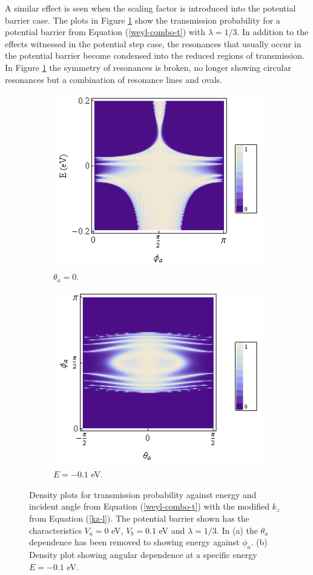 		A similar effect is seen when the scaling factor is introduced into the potential barrier case. The plots in Figure \ref{barrier-l3} show the transmission probability for a potential barrier from Equation (\ref{weyl-combo-t}) with $\lambda=1/3$. In addition to the effects witnessed in the potential step case, the resonances that usually occur in the potential barrier become condensed into the reduced regions of transmission. In Figure \ref{barrier-l3} the symmetry of resonances is broken, no longer showing circular resonances but a combination of resonance lines and ovals.
		\begin{figure}[h]
			\begin{subfigure}[h]{0.5\textwidth}
				\centerline{\includegraphics[scale=0.55]{images/barrier-l3}}
				\caption{$\theta_{a}=0$.}
			\end{subfigure}
			\hspace{0.5cm}
			\begin{subfigure}[h]{0.5\textwidth}
				\centerline{\includegraphics[scale=0.55]{images/phi-theta-barrier}}
				\caption{$E=-0.1$ eV.}
			\end{subfigure}
			\caption{Density plots for transmission probability against energy and incident angle from Equation (\ref{weyl-combo-t}) with the modified $k_{z}$ from Equation (\ref{kz-l}). The potential barrier shown has the characteristics $V_{a}=0$ eV, $V_{b}=0.1$ eV and $\lambda = 1/3$. In (a) the $\theta_{a}$ dependence has been removed to showing energy against $\phi_{a}$. (b) Density plot showing angular dependence at a specific energy $E=-0.1$ eV.}
			\label{barrier-l3}
		\end{figure}	

